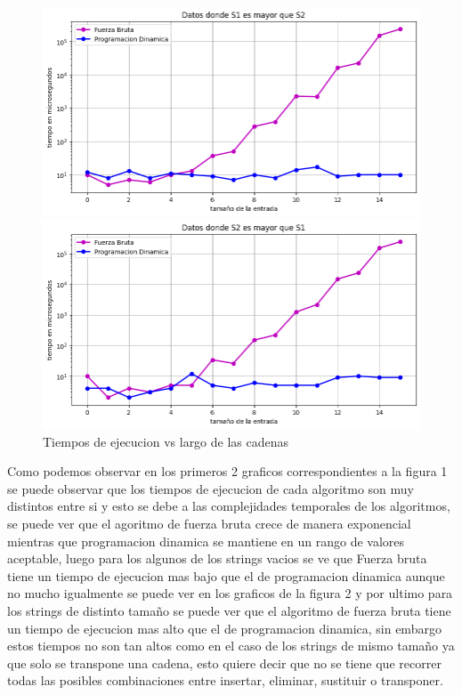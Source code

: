 \begin{figure}[H]
    \centering
    \begin{minipage}[t]{0.5\textwidth}
        \includegraphics[width=\textwidth]{images/s1mayor.png}
    \end{minipage}%
    \begin{minipage}[t]{0.5\textwidth}
        \includegraphics[width=\textwidth]{images/s1menor.png}   \end{minipage}%
    \caption{Tiempos de ejecucion vs largo de las cadenas}
    \label{fig:Tiempos de ejecucion vs largo de las cadenas}
\end{figure}


Como podemos observar en los primeros 2 graficos correspondientes a la figura 1 se puede observar que los tiempos de ejecucion de cada algoritmo 
son muy distintos entre si y esto se debe a las complejidades temporales de los algoritmos, se puede ver que el agoritmo de fuerza bruta 
crece de manera exponencial mientras que programacion dinamica se mantiene en un rango de valores aceptable, luego para los algunos de los strings
vacios se ve que Fuerza bruta tiene un tiempo de ejecucion mas bajo que el de programacion dinamica aunque no mucho igualmente se puede
ver en los graficos de la figura 2 y por ultimo para los strings de distinto tamaño se puede ver que el algoritmo de fuerza bruta tiene un tiempo 
de ejecucion mas alto que el de programacion dinamica, sin embargo estos tiempos no son tan altos como en el caso de los strings de
mismo tamaño ya que solo se transpone una cadena, esto quiere decir que no se tiene que recorrer todas las posibles combinaciones
entre insertar, eliminar, sustituir o transponer.


